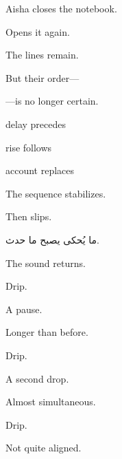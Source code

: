 \medskip

Aisha closes the notebook.

Opens it again.

\medskip

The lines remain.

\medskip

But their order---

\medskip

---is no longer certain.

\medskip

 delay precedes

 rise follows

 account replaces

\medskip

The sequence stabilizes.

Then slips.

\medskip

\begin{AR}
ما يُحكى يصبح ما حدث.
\end{AR}

\medskip

The sound returns.

\medskip

Drip.

\medskip

A pause.

Longer than before.

\medskip

Drip.

\medskip

A second drop.

Almost simultaneous.

\medskip

Drip.

\medskip

Not quite aligned.
